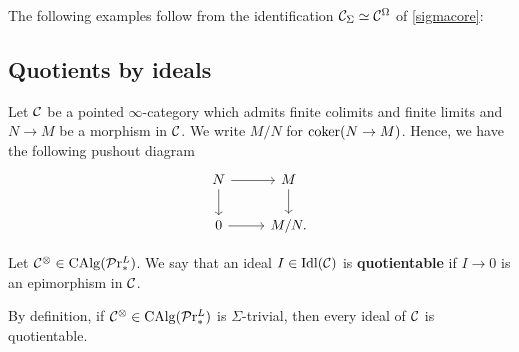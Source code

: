 \documentclass[10pt,a4paper,oneside]{article}
\begin{document}
\begin{ex}\label{ex:sigma-trivialization}
The following examples follow from the identification $\mathcal{C}_{\Sigma}\simeq\mathcal{C}^{\Omega}$ of 
\cref{sigmacore}:
\end{ex}

\subsection{Quotients by ideals}\label{sec4}

\begin{nota}
Let $\mathcal{C}$ be a pointed $\infty$-category which admits finite colimits and finite limits and $N\to M$ be a morphism in $\mathcal{C}$. We write $M/N$ for $\operatorname{coker}(N\to M)$. Hence, we have the following pushout diagram
$$%
\begin{tikzcd}
N \arrow[d] \arrow[r] & M \arrow[d] \\
0 \arrow[r]           & M/N     .   
\end{tikzcd}$$
\end{nota}

\begin{de}
Let $\mathcal{C}^\otimes\in \operatorname{CAlg}(\mathcal{P}\mathrm{r}^L_{*})$. We say that an ideal $I\in \operatorname{Idl}(\mathcal{C})$ is \textbf{quotientable} if $I\to 0$ is an epimorphism in $\mathcal{C}$.
\end{de}

\begin{rem}
By definition, if $\mathcal{C}^\otimes\in \operatorname{CAlg}(\mathcal{P}\mathrm{r}^L_{*})$ is $\Sigma$-trivial, then every ideal of $\mathcal{C}$ is quotientable.
\end{rem}
\end{document}
